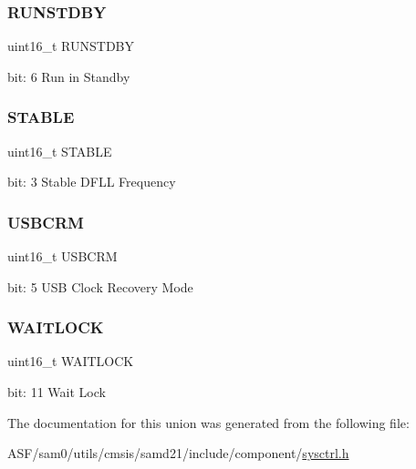 \subsubsection{\texorpdfstring{RUNSTDBY}{RUNSTDBY}}
{\footnotesize\ttfamily uint16\+\_\+t R\+U\+N\+S\+T\+D\+BY}

bit\+: 6 Run in Standby \mbox{\label{union_s_y_s_c_t_r_l___d_f_l_l_c_t_r_l___type_a086f39f4886c0847902d3df85ef6efee}} 
\subsubsection{\texorpdfstring{STABLE}{STABLE}}
{\footnotesize\ttfamily uint16\+\_\+t S\+T\+A\+B\+LE}

bit\+: 3 Stable D\+F\+LL Frequency \mbox{\label{union_s_y_s_c_t_r_l___d_f_l_l_c_t_r_l___type_ab1dabdf102e02c06e374206bfb8b3655}} 
\subsubsection{\texorpdfstring{USBCRM}{USBCRM}}
{\footnotesize\ttfamily uint16\+\_\+t U\+S\+B\+C\+RM}

bit\+: 5 U\+SB Clock Recovery Mode \mbox{\label{union_s_y_s_c_t_r_l___d_f_l_l_c_t_r_l___type_a6deb12a80d51d2024a2a4b387b99a318}} 
\subsubsection{\texorpdfstring{WAITLOCK}{WAITLOCK}}
{\footnotesize\ttfamily uint16\+\_\+t W\+A\+I\+T\+L\+O\+CK}

bit\+: 11 Wait Lock 

The documentation for this union was generated from the following file\+:\begin{DoxyCompactItemize}
\item 
A\+S\+F/sam0/utils/cmsis/samd21/include/component/\mbox{\hyperlink{component_2sysctrl_8h}{sysctrl.\+h}}\end{DoxyCompactItemize}
